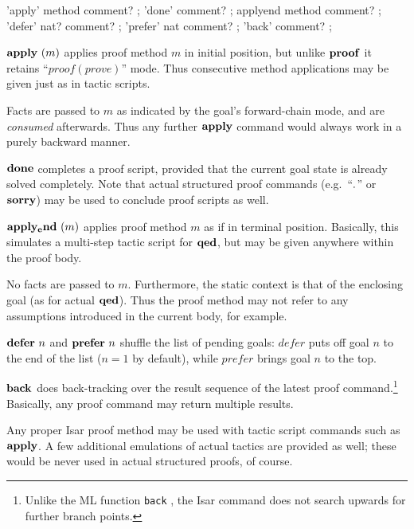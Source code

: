 \begin{rail}
  'apply' method comment?
  ;
  'done' comment?
  ;
  applyend method comment?
  ;
  'defer' nat? comment?
  ;
  'prefer' nat comment?
  ;
  'back' comment?
  ;
\end{rail}

\begin{descr}
\item [${\mathord{\mathbf{apply}}}~(m)$] applies proof method $m$ in initial
  position, but unlike ${\mathord{\mathbf{proof}}}$ it retains ``$proof(prove)$'' mode.  Thus
  consecutive method applications may be given just as in tactic scripts.
  
  Facts are passed to $m$ as indicated by the goal's forward-chain mode, and
  are \emph{consumed} afterwards.  Thus any further ${\mathord{\mathbf{apply}}}$
  command would always work in a purely backward manner.
  
\item [${\mathord{\mathbf{done}}}$] completes a proof script, provided that the
  current goal state is already solved completely.  Note that actual
  structured proof commands (e.g.\ ``${\mathord{\mathbf{.}}}$'' or ${\mathord{\mathbf{sorry}}}$) may be used to
  conclude proof scripts as well.

\item [${\mathord{\mathbf{apply_end}}}~(m)$] applies proof method $m$ as if in
  terminal position.  Basically, this simulates a multi-step tactic script for
  ${\mathord{\mathbf{qed}}}$, but may be given anywhere within the proof body.
  
  No facts are passed to $m$.  Furthermore, the static context is that of the
  enclosing goal (as for actual ${\mathord{\mathbf{qed}}}$).  Thus the proof method may not
  refer to any assumptions introduced in the current body, for example.
\item [${\mathord{\mathbf{defer}}}~n$ and ${\mathord{\mathbf{prefer}}}~n$] shuffle the list
  of pending goals: $defer$ puts off goal $n$ to the end of the list ($n = 1$
  by default), while $prefer$ brings goal $n$ to the top.
\item [${\mathord{\mathbf{back}}}$] does back-tracking over the result sequence of
  the latest proof command.\footnote{Unlike the ML function \texttt{back}
    \cite{isabelle-ref}, the Isar command does not search upwards for further
    branch points.} Basically, any proof command may return multiple results.
\end{descr}

Any proper Isar proof method may be used with tactic script commands such as
${\mathord{\mathbf{apply}}}$.  A few additional emulations of actual tactics are
provided as well; these would be never used in actual structured proofs, of
course.

